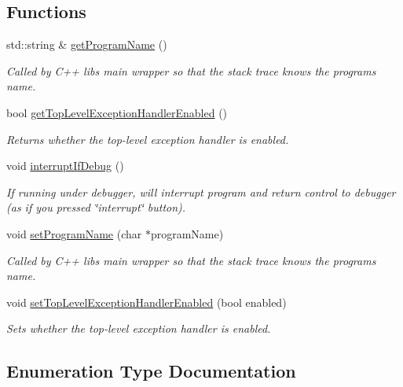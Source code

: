 \subsection*{Functions}
\begin{DoxyCompactItemize}
\item 
std\+::string \& \mbox{\hyperlink{namespacegexceptions_a7056566d5a77c39b9b0bc7060426db66}{get\+Program\+Name}} ()
\begin{DoxyCompactList}\small\item\em Called by C++ lib\textquotesingle{}s main wrapper so that the stack trace knows the program\textquotesingle{}s name. \end{DoxyCompactList}\item 
bool \mbox{\hyperlink{namespacegexceptions_a6a3658a12893a1ea2acaa6fc6e8b6d82}{get\+Top\+Level\+Exception\+Handler\+Enabled}} ()
\begin{DoxyCompactList}\small\item\em Returns whether the top-\/level exception handler is enabled. \end{DoxyCompactList}\item 
void \mbox{\hyperlink{namespacegexceptions_ac271a27f160c64bf051b5daf6e0fe6a1}{interrupt\+If\+Debug}} ()
\begin{DoxyCompactList}\small\item\em If running under debugger, will interrupt program and return control to debugger (as if you pressed \char`\"{}interrupt\char`\"{} button). \end{DoxyCompactList}\item 
void \mbox{\hyperlink{namespacegexceptions_a47c669ec573608d439258c48c202d58a}{set\+Program\+Name}} (char $\ast$program\+Name)
\begin{DoxyCompactList}\small\item\em Called by C++ lib\textquotesingle{}s main wrapper so that the stack trace knows the program\textquotesingle{}s name. \end{DoxyCompactList}\item 
void \mbox{\hyperlink{namespacegexceptions_aecffab3c2119276b44cb55564b11e520}{set\+Top\+Level\+Exception\+Handler\+Enabled}} (bool enabled)
\begin{DoxyCompactList}\small\item\em Sets whether the top-\/level exception handler is enabled. \end{DoxyCompactList}\end{DoxyCompactItemize}


\subsection{Enumeration Type Documentation}
\mbox{\label{namespacegexceptions_af9bff8ff1154a04a899276af806b8586}} 
